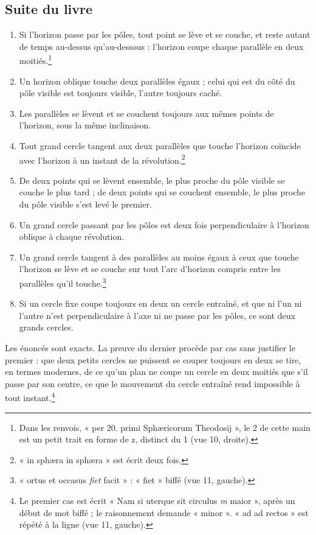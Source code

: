 \documentclass[11pt,a4paper]{article}
\begin{document}
\subsection*{Suite du livre}

\begin{enumerate}
  \item[5.] Si l'horizon passe par les pôles, tout point se lève et se couche,
    et reste autant de temps au-dessus qu'au-dessous : l'horizon coupe chaque
    parallèle en deux moitiés.\footnote{Dans les renvois, « per 20. primi
    Sphæricorum Theodosij », le 2 de cette main est un petit trait en forme de
    z, distinct du 1 (vue 10, droite).}
  \item[6.] Un horizon oblique touche deux parallèles égaux ; celui qui est du
    côté du pôle visible est toujours visible, l'autre toujours caché.
  \item[7.] Les parallèles se lèvent et se couchent toujours aux mêmes points
    de l'horizon, sous la même inclinaison.
  \item[8.] Tout grand cercle tangent aux deux parallèles que touche l'horizon
    coïncide avec l'horizon à un instant de la révolution.\footnote{« in sphæra
    in sphæra » est écrit deux fois.}
  \item[9.] De deux points qui se lèvent ensemble, le plus proche du pôle
    visible se couche le plus tard ; de deux points qui se couchent ensemble,
    le plus proche du pôle visible s'est levé le premier.
  \item[10.] Un grand cercle passant par les pôles est deux fois perpendiculaire
    à l'horizon oblique à chaque révolution.
  \item[11.] Un grand cercle tangent à des parallèles au moins égaux à ceux que
    touche l'horizon se lève et se couche sur tout l'arc d'horizon compris
    entre les parallèles qu'il touche.\footnote{« ortus et occasus
    \emph{fiet} facit » : « fiet » biffé (vue 11, gauche).}
  \item[12.] Si un cercle fixe coupe toujours en deux un cercle entraîné, et que
    ni l'un ni l'autre n'est perpendiculaire à l'axe ni ne passe par les pôles,
    ce sont deux grands cercles.
\end{enumerate}

Les énoncés sont exacts. La preuve du dernier procède par cas sans justifier le
premier : que deux petits cercles ne puissent se couper toujours en deux se
tire, en termes modernes, de ce qu'un plan ne coupe un cercle en deux moitiés
que s'il passe par son centre, ce que le mouvement du cercle entraîné rend
impossible à tout instant.\footnote{Le premier cas est écrit « Nam si uterque sit
circulus \emph{m} maior », après un début de mot biffé ; le raisonnement demande
« minor ». « ad ad rectos » est répété à la ligne (vue 11, gauche).}
\end{document}

